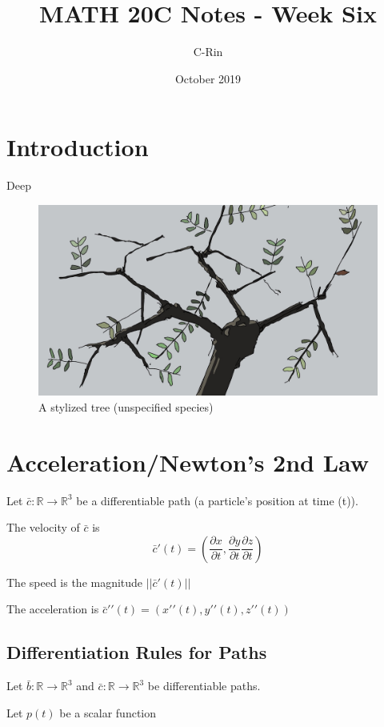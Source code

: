 \documentclass{article}
\title{MATH 20C Notes - Week Six}
\author{C-Rin}
\date{October 2019}
\begin{document}
\maketitle

\section*{Introduction}
Deep 

\begin{figure}[h!]
\centering
\includegraphics[scale=0.1]{tree.jpg}
\caption{A stylized tree (unspecified species)}
\end{figure}


\section{Acceleration/Newton's 2nd Law}

Let $\bar{c}:\mathbb{R}\rightarrow\mathbb{R}^3$ be a differentiable path (a particle's position at time (t)).

The velocity of $\bar{c}$ is 
\[\bar{c}\prime (t) = (\frac{\partial x}{\partial t},\frac{\partial y}{\partial t}\frac{\partial z}{\partial t})\]

The speed is the magnitude $||\bar{c}\prime (t)||$

The acceleration is $\bar{c}\prime\prime(t)=(x\prime\prime(t),y\prime\prime(t),z\prime\prime(t))$

\subsection{Differentiation Rules for Paths}
Let $\bar{b}:\mathbb{R}\rightarrow\mathbb{R}^3$ and $\bar{c}:\mathbb{R}\rightarrow\mathbb{R}^3$ be differentiable paths.

Let $p(t)$ be a scalar function
\end{document}

